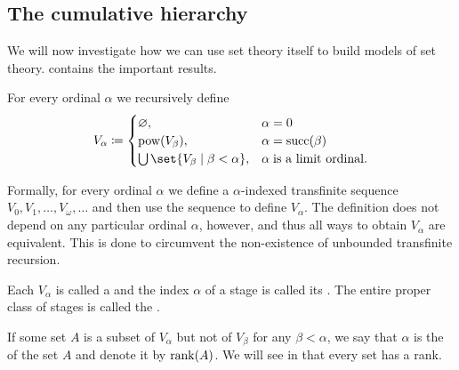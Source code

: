 \subsection{The cumulative hierarchy}\label{subsec:cumulative_hierarchy}

We will now investigate how we can use set theory itself to build models of set theory.  contains the important results.

\begin{definition}\label{def:cumulative_hierarchy}
  For every ordinal \( \alpha \) we recursively define
  \begin{equation*}
    V_\alpha \coloneqq \begin{cases}
      \varnothing,                                  &\alpha = 0 \\
      \pow(V_\beta),                                &\alpha = \op{succ}(\beta) \\
      \bigcup\set{ V_\beta \given \beta < \alpha }, &\alpha \T{is a limit ordinal.}
    \end{cases}
  \end{equation*}

  Formally, for every ordinal \( \alpha \) we define a \( \alpha \)-indexed transfinite sequence \( V_0, V_1, \ldots, V_\omega, \ldots \) and then use the sequence to define \( V_\alpha \). The definition does not depend on any particular ordinal \( \alpha \), however, and thus all ways to obtain \( V_\alpha \) are equivalent. This is done to circumvent the non-existence of unbounded transfinite recursion.

  Each \( V_\alpha \) is called a  and the index \( \alpha \) of a stage is called its . The entire proper class of stages is called the .

  If some set \( A \) is a subset of \( V_\alpha \) but not of \( V_\beta \) for any \( \beta < \alpha \), we say that \( \alpha \) is the  of the set \( A \) and denote it by \( \operatorname{rank}(A) \). We will see in  that every set has a rank.
\end{definition}

